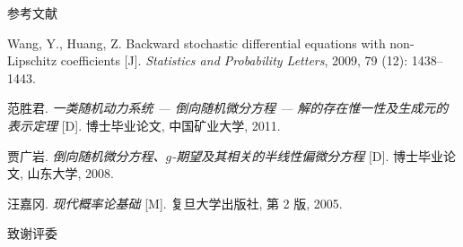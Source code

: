 \documentclass[xcolor=svgnames,serif,table,10pt]{beamer}
\begin{document}
\begin{frame}[allowframebreaks]{参考文献}
\begin{thebibliography}{57}
Wang, Y., Huang, Z.
\newblock Backward stochastic differential equations with non-{L}ipschitz
  coefficients [J].
\newblock \emph{Statistics and Probability Letters}, 2009, 79
  (12): 1438--1443.

{\beamertemplatebookbibitems
{}
范胜君.
\newblock
  \emph{一类随机动力系统 --- 倒向随机微分方程 --- 解的存在惟一性及生成元的表示定理} [D].
\newblock 博士毕业论文, 中国矿业大学, 2011.}

{\beamertemplatebookbibitems
{}
贾广岩.
\newblock \emph{倒向随机微分方程、$g$-期望及其相关的半线性偏微分方程} [D].
\newblock 博士毕业论文, 山东大学, 2008.}



{\beamertemplatebookbibitems
{}
汪嘉冈.
\newblock \emph{现代概率论基础} [M].
\newblock 复旦大学出版社, 第 2 版, 2005.}

\end{thebibliography}
\end{frame}

\begin{frame}{致谢评委}
  \begin{center}
  \end{center}
\end{frame}
\end{document}
